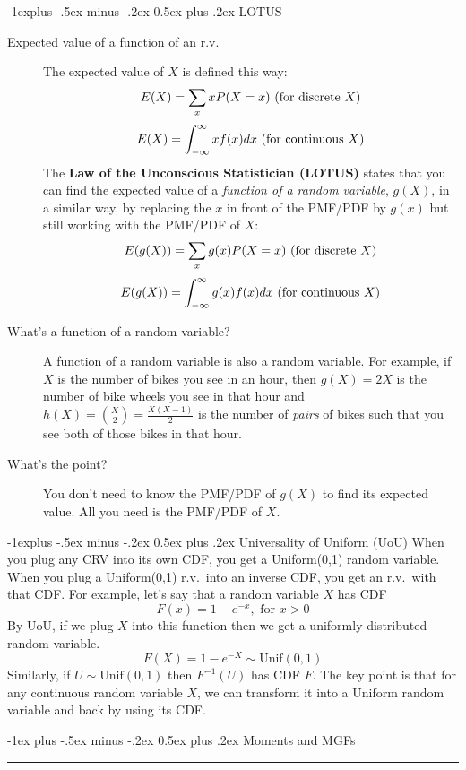 \documentclass[6pt,landscape]{article}
\makeatletter
\renewcommand{\section}{\@startsection{section}{1}{0mm}%
                                {-1ex plus -.5ex minus -.2ex}%
                                {0.5ex plus .2ex}%
                                {\normalfont\large\bfseries}}
\renewcommand{\subsection}{\@startsection{subsection}{2}{0mm}%
                                {-1explus -.5ex minus -.2ex}%
                                {0.5ex plus .2ex}%
                                {\normalfont\normalsize\bfseries}}
\makeatother
\begin{document}
\begin{multicols*}{3}
\subsection{LOTUS}
\begin{description}
\item[Expected value of a function of an r.v.]
The expected value of $X$ is defined this way:
\[E(X) = \sum_x xP(X=x) \textnormal{ (for discrete $X$)}\]
\[E(X) = \int^\infty_{-\infty}xf(x)dx  \textnormal{ (for continuous $X$)}\]
The \textbf{Law of the Unconscious Statistician (LOTUS)} states that you can find the expected value of a \emph{function of a random variable}, $g(X)$, in a similar way, by replacing the $x$ in front of the PMF/PDF by $g(x)$ but still working with the PMF/PDF of $X$:
\[E(g(X)) = \sum_x g(x)P(X=x) \textnormal{ (for discrete $X$)}\]
\[E(g(X)) = \int^\infty_{-\infty}g(x)f(x)dx \textnormal{ (for continuous $X$)}\]
\item[What's a function of a random variable?] A function of a random variable is also a random variable. For example, if $X$ is the number of bikes you see in an hour, then $g(X) =  2X$ is the number of bike wheels you see in that hour and $h(X) = {X \choose 2} = \frac{X(X-1)}{2}$ is the number of \emph{pairs} of bikes such that you see both of those bikes in that hour.
\item[What's the point?] You don't need to know the PMF/PDF of $g(X)$ to find its expected value. All you need is the PMF/PDF of $X$. 
\end{description}

\subsection{Universality of Uniform (UoU)} When you plug any CRV into its own CDF, you get a Uniform(0,1) random variable. When you plug a Uniform(0,1) r.v.~into an inverse CDF, you get an r.v.~with that CDF. For example, let's say that a random variable $X$ has CDF
    \[ F(x) = 1 - e^{-x}, \textrm{ for $x>0$} \]
    By  UoU, if we plug $X$ into this function then we get a uniformly distributed random variable.
    \[ F(X) = 1 - e^{-X} \sim \textrm{Unif}(0,1)\]
    Similarly, if $U \sim \textrm{Unif}(0,1)$ then $F^{-1}(U)$ has CDF $F$. The key point is that {for any continuous random variable $X$, we can transform it into a Uniform random variable and back by using its CDF.}

\section{Moments and MGFs}\smallskip \hrule height 2pt \smallskip


\end{multicols*}
\end{document}
